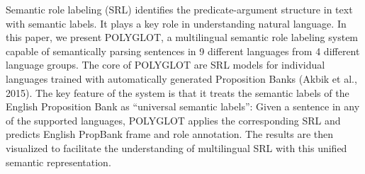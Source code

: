Semantic role labeling (SRL) identifies the predicate-argument structure in text with semantic labels. It plays a key role in understanding natural language. In this paper, we present POLYGLOT, a multilingual semantic role labeling system capable of semantically parsing sentences in 9 different languages from 4 different language groups. The core of POLYGLOT are SRL models for individual languages trained with automatically generated Proposition Banks (Akbik et al., 2015). The key feature of the system is that it treats the semantic labels of the English Proposition Bank as ``universal semantic labels'': Given a sentence in any of the supported languages, POLYGLOT applies the corresponding SRL and predicts English PropBank frame and role annotation. The results are then visualized to facilitate the understanding of multilingual SRL with this unified semantic representation.
